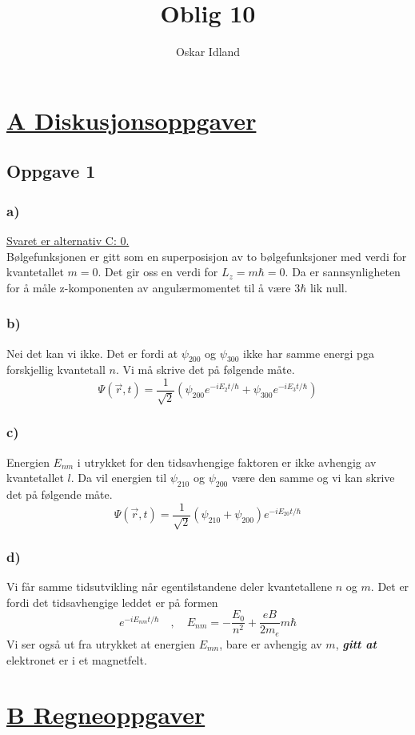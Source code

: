 \documentclass{article}
\author{Oskar Idland}
\title{Oblig 10}
\date{}
\begin{document}
\maketitle
\newpage
\section*{\underline{A Diskusjonsoppgaver}}
\subsection*{Oppgave 1}
\subsubsection*{a)}
\underline{Svaret er alternativ C: 0.} \\
Bølgefunksjonen er gitt som en superposisjon av to bølgefunksjoner med verdi for kvantetallet $m = 0$. Det gir oss en verdi for $L_z = mℏ = 0$. Da er sannsynligheten for å måle z-komponenten av angulærmomentet til å være $3ℏ$ lik null.

\subsubsection*{b)}
Nei det kan vi ikke. Det er fordi at $ψ_{200}$ og $ψ_{300}$ ikke har samme energi pga forskjellig kvantetall $n$. Vi må skrive det på følgende måte. 
\[
Ψ(\vec{r},t) = \frac{1}{\sqrt{2}}\left(ψ_{200}e^{-iE_2t / ℏ} + ψ_{300}e^{-iE_3t / ℏ}\right)
\]
\subsubsection*{c)}
Energien $E_{nm}$ i utrykket for den tidsavhengige faktoren er ikke avhengig av kvantetallet $l$. Da vil energien til $ψ_{210}$ og $ψ_{200}$ være den samme og vi kan skrive det på følgende måte.
\[
Ψ(\vec{r}, t) = \frac{1}{\sqrt{2}} \left(ψ_{210} + ψ_{200}\right)e^{-iE_{20}t / ℏ}
\]
\subsubsection*{d)}
Vi får samme tidsutvikling når egentilstandene deler kvantetallene $n$ og $m$. Det er fordi det tidsavhengige leddet er på formen
\[
e^{-iE_{nm}t / ℏ}\quad , \quad E_{nm} = - \frac{E_0}{n^2} + \frac{eB}{2 m_e}mℏ
\]
Vi ser også ut fra utrykket at energien $E_{mn}$, bare er avhengig av $m$, \textbf{\textit{gitt at}} elektronet er i et magnetfelt. 

\section*{\underline{B Regneoppgaver}}
\end{document}
